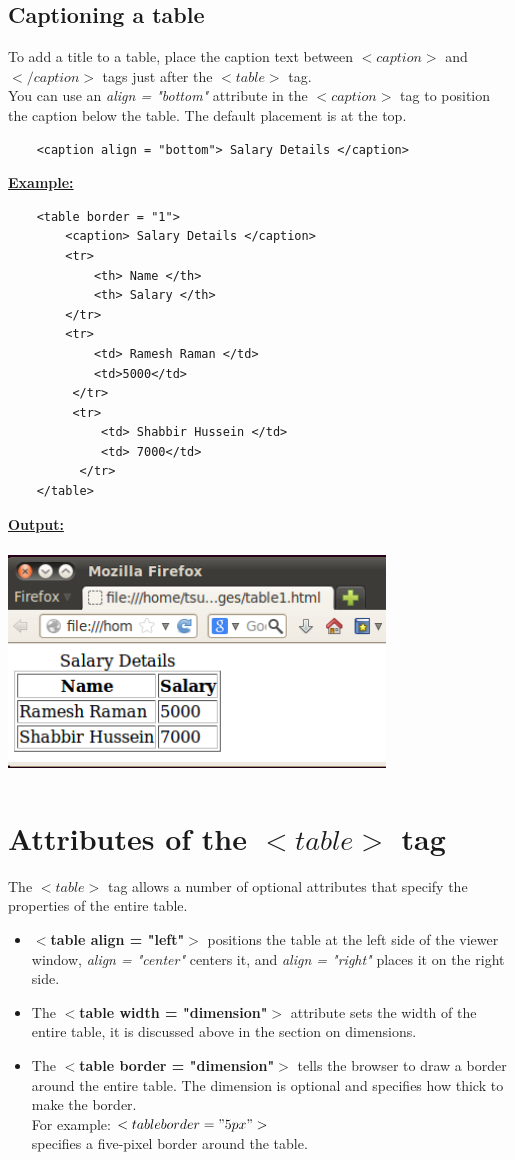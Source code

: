 \documentclass[11pt,a4paper]{article}
\begin{document}
\subsection*{Captioning a table}
To add a title to a table, place the caption text between $<caption>$ and $</caption>$ tags just after the
$<table>$ tag.\\	

You can use an \emph{align = "bottom"} attribute in the $<caption>$ tag to position the caption below the table. The default placement is at the top.\\
\begin{verbatim}
    <caption align = "bottom"> Salary Details </caption>
\end{verbatim}
\underline{\textbf{Example:}}
\begin{verbatim}
    <table border = "1">
        <caption> Salary Details </caption>
        <tr> 
            <th> Name </th>
            <th> Salary </th>
        </tr>
        <tr>
            <td> Ramesh Raman </td>
            <td>5000</td>
         </tr>
         <tr>
             <td> Shabbir Hussein </td>
             <td> 7000</td>
          </tr>
    </table>
\end{verbatim}


\underline{\textbf{Output:}}

\includegraphics[height = 60mm, width = 100mm]{Table2.png}
\section*{Attributes of the $<table>$ tag}
The $<table>$ tag allows a number of optional attributes that specify the properties of the entire table.

\begin{itemize}
\item \textbf{$<$table align = "left"$>$} positions the table at the left side of the viewer window, \emph{align = "center"} centers it, and \emph{align = "right"} places it on the right side.
\item The \textbf{$<$table width = "dimension"$>$} attribute sets the width of the entire table, it is discussed above in the section on dimensions.
\item  The \textbf{$<$table border = "dimension"$>$} tells the browser to draw a border around the entire table. 
The dimension is optional and specifies how thick to make the border. \\
For example: \emph{$<table border = "5px">$}\\
specifies a five-pixel border around the table.
\end{itemize}
\end{document}
